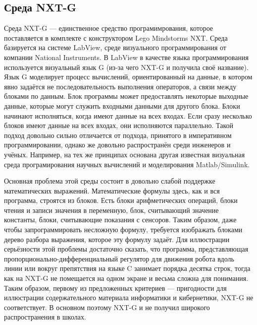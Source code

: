 \documentclass[a4paper]{article}
\begin{document}
\subsection{Среда NXT-G}
Среда NXT-G --- единственное средство програмимрования, которое поставляется в комплекте с конструктором Lego Mindstorms NXT. Среда базируется на системе LabView, среде визуального программирования от компании National Instruments. В LabView в качестве языка программирования используется визуальный язык G (из-за чего NXT-G и получила своё название). Язык G моделирует процесс вычислений, ориентированный на данные, в котором явно задаётся не последовательность выполнения операторов, а связи между блоками по данным. Блок программы может предоставлять некоторые выходные данные, которые могут служить входными данными для другого блока. Блоки начинают исполняться, когда имеют данные на всех входах. Если сразу несколько блоков имеют данные на всех входах, они исполняются параллельно. Такой подход довольно сильно отличается от подхода, принятого в императивном программировании, однако же довольно распространён среди инженеров и учёных. Например, на тех же принципах основана другая известная визуальная среда програмирования научных вычислений и моделирования Matlab/Simulink.

Основная проблема этой среды состоит в довольно слабой поддержке математических выражений. Математические формулы здесь, как и вся программа, строятся из блоков. Есть блоки арифметических операций, блоки чтения и записи значения в переменную, блок, считывающий значение константы, блоки, считывающие показания с сенсоров. Таким образом, даже чтобы запрограммировать несложную формулу, требуется изображать блоками дерево разбора выражения, которое эту формулу задаёт. Для иллюстрации серьёзности этой проблемы достаточно сказать, что программа, представляющая пропорционально-дифференциальный регулятор для движения робота вдоль линии или вокруг препятствия на языке C занимает порядка десятка строк, тогда как на NXT-G не помещается на одном экране и весьма сложна для понимания. Таким образом, первому из предложенных критериев --- пригодности для иллюстрации содержательного материала информатики и кибернетики, NXT-G не соответствует. В основном поэтому NXT-G и не получил широкого распространения в школах.
\end{document}
